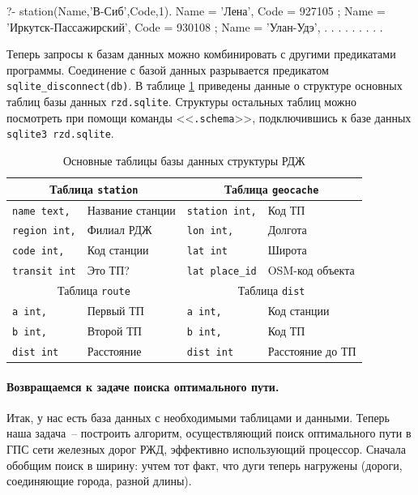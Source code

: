 \documentclass[a4paper,14pt, openany, twoside, final]{extbook} %
\begin{document}
\begin{proexp}
?- station(Name,'В-Сиб',Code,1).
Name = 'Лена',
Code = 927105 ;
Name = 'Иркутск-Пассажирский',
Code = 930108 ;
Name = 'Улан-Удэ',
. . . . . . . . .
\end{proexp}


Теперь запросы к базам данных можно комбинировать с другими предикатами программы.  Соединение с базой данных разрывается предикатом \texttt{sqlite\_disconnect(db)}.  В таблице \ref{tab:dbstruct} приведены данные о структуре основных таблиц базы данных \texttt{rzd.sqlite}.  Структуры остальных таблиц можно посмотреть при помощи команды <<\texttt{.schema}>>, подключившись к базе данных \texttt{sqlite3 rzd.sqlite}.
\begin{table}[hbt]
\begin{center}\small
\caption{Основные таблицы базы данных структуры РДЖ} \label{tab:dbstruct}
\begin{tabular}{|l|l||l|l|}
 \hline
\multicolumn{2}{|c||}{Таблица \texttt{station}} & \multicolumn{2}{c|}{Таблица \texttt{geocache}} \\
\hline
\texttt{name text,} & Название станции & \texttt{station int,} & Код ТП \\
\hline
\texttt{region int,} & Филиал РДЖ & \texttt{lon int,} & Долгота \\
\hline
\texttt{code int,} & Код станции & \texttt{lat int} & Широта \\
\hline
\texttt{transit int} & Это ТП? & \texttt{lat place\_id} & OSM-код объекта \\
  \hline
\multicolumn{2}{|c||}{Таблица \texttt{route}} & \multicolumn{2}{c|}{Таблица \texttt{dist}} \\
  \hline
\texttt{a int,} & Первый ТП & \texttt{a int,} & Код станции \\
\hline
\texttt{b int,} & Второй ТП & \texttt{b int,} & Код ТП \\
\hline
\texttt{dist int} & Расстояние & \texttt{dist int} & Расстояние до ТП \\
\hline
\end{tabular}
\end{center}
\end{table}

\paragraph{Возвращаемся к задаче поиска оптимального пути.} \label{par:informedcont} Итак, у нас есть база данных с необходимыми таблицами и данными.  Теперь наша задача~-- построить алгоритм, осуществляющий поиск оптимального пути в ГПС сети железных дорог РЖД, эффективно использующий процессор.  Сначала обобщим поиск в ширину: учтем тот факт, что дуги теперь нагружены (дороги, соединяющие города, разной длины).
\end{document}
